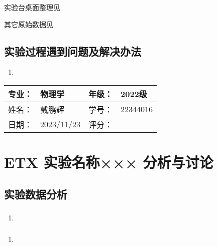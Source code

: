 \documentclass[dvipsnames, svgnames,a4paper,11pt]{article}
\begin{document}
	实验台桌面整理见%
	
	其它原始数据见%
	
	\subsection{实验过程遇到问题及解决办法}
	\begin{enumerate}
		\item 
	\end{enumerate}
	
	
	
	\clearpage
	
	\begin{table}
		\renewcommand\arraystretch{1.7}
		\begin{tabularx}{\textwidth}{|X|X|X|X|}
			\hline
			专业：& 物理学 &年级：& 2022级\\
			\hline
			姓名： & 戴鹏辉 & 学号：& 22344016\\
			\hline
			日期：& 2023/11/23 & 评分： &\\
			\hline
		\end{tabularx}
	\end{table}
	
	\section{ETX 实验名称××× \quad\heiti 分析与讨论}
	
	\subsection{实验数据分析}
	
	\subsubsection{}
	\begin{enumerate}
		\item 
	\end{enumerate}
	
	\subsubsection{}
	\begin{enumerate}
		\item 
	\end{enumerate}
	
\end{document}
